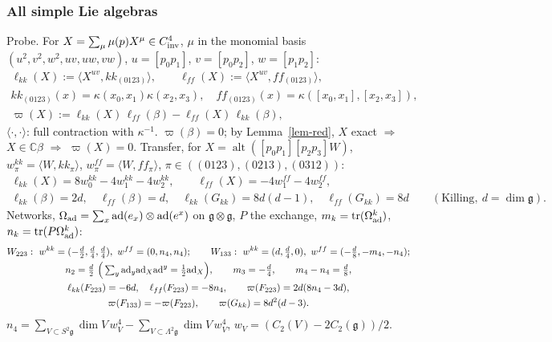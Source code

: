 \documentclass[10pt,a4paper]{article}
\numberwithin{equation}{section}
\theoremstyle{definition}
\theoremstyle{remark}
\newcommand{\tr}{\operatorname{tr}}
\newcommand{\alt}{\operatorname{alt}}
\newcommand{\g}{\mathfrak g}
\begin{document}
\subsubsection*{All simple Lie algebras}

Probe. For $X=\sum_\mu\mu(p)X^\mu\in C^4_{\rm inv}$, $\mu$ in the monomial basis $(u^2,v^2,w^2,uv,uw,vw)$, $u=[p_0p_1]$, $v=[p_0p_2]$, $w=[p_1p_2]$:
\begin{gather}
\ell_{kk}(X):=\langle X^{uv},kk_{(0123)}\rangle,\qquad \ell_{ff}(X):=\langle X^{uv},ff_{(0123)}\rangle,\\ kk_{(0123)}(x)=\kappa(x_0,x_1)\kappa(x_2,x_3),\quad ff_{(0123)}(x)=\kappa([x_0,x_1],[x_2,x_3]),\\
\varpi(X):=\ell_{kk}(X)\,\ell_{ff}(\beta)-\ell_{ff}(X)\,\ell_{kk}(\beta),
\end{gather}
$\langle\cdot,\cdot\rangle$: full contraction with $\kappa^{-1}$. $\varpi(\beta)=0$; by Lemma~\ref{lem-red}, $X$ exact $\Rightarrow$ $X\in\mathbb C\beta$ $\Rightarrow$ $\varpi(X)=0$. Transfer, for $X=\alt([p_0p_1][p_2p_3]W)$, $w^{kk}_\pi=\langle W,kk_\pi\rangle$, $w^{ff}_\pi=\langle W,ff_\pi\rangle$, $\pi\in((0123),(0213),(0312))$:
\begin{gather}
\ell_{kk}(X)=8w^{kk}_0-4w^{kk}_1-4w^{kk}_2,\qquad \ell_{ff}(X)=-4w^{ff}_1-4w^{ff}_2,\\
\ell_{kk}(\beta)=2d,\quad \ell_{ff}(\beta)=d,\quad \ell_{kk}(G_{kk})=8d(d-1),\quad \ell_{ff}(G_{kk})=8d\qquad(\text{Killing},\ d=\dim\g).
\end{gather}
Networks, $\Omega_{\rm ad}=\sum_x{\rm ad}(e_x)\otimes{\rm ad}(e^x)$ on $\g\otimes\g$, $P$ the exchange, $m_k=\tr(\Omega_{\rm ad}^k)$, $n_k=\tr(P\Omega_{\rm ad}^k)$:
\begin{gather}
W_{223}:\ w^{kk}=(-\tfrac d2,\tfrac d4,\tfrac d4),\ w^{ff}=(0,n_4,n_4);\qquad W_{133}:\ w^{kk}=(d,\tfrac d4,0),\ w^{ff}=(-\tfrac d8,-m_4,-n_4);\\
n_2=\tfrac d2\ \Big(\textstyle\sum_y{\rm ad}_y{\rm ad}_X{\rm ad}^y=\tfrac12{\rm ad}_X\Big),\qquad m_3=-\tfrac d4,\qquad m_4-n_4=\tfrac d8,\\
\ell_{kk}(F_{223})=-6d,\quad \ell_{ff}(F_{223})=-8n_4,\qquad \varpi(F_{223})=2d(8n_4-3d),\\ \varpi(F_{133})=-\varpi(F_{223}),\qquad \varpi(G_{kk})=8d^2(d-3).
\end{gather}
$n_4=\sum_{V\subset S^2\g}\dim V\,w_V^4-\sum_{V\subset\Lambda^2\g}\dim V\,w_V^4$, $w_V=(C_2(V)-2C_2(\g))/2$.
\end{document}
